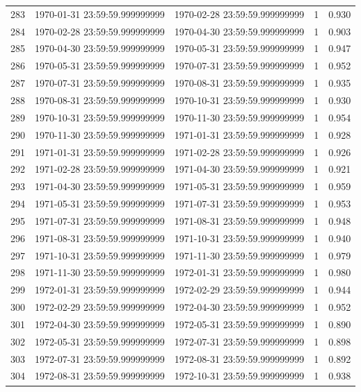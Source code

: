 \begin{table}
\begin{tabular}{lcccc}
283 & 1970-01-31 23:59:59.999999999 & 1970-02-28 23:59:59.999999999 & 1 & 0.930 \\
284 & 1970-02-28 23:59:59.999999999 & 1970-04-30 23:59:59.999999999 & 1 & 0.903 \\
285 & 1970-04-30 23:59:59.999999999 & 1970-05-31 23:59:59.999999999 & 1 & 0.947 \\
286 & 1970-05-31 23:59:59.999999999 & 1970-07-31 23:59:59.999999999 & 1 & 0.952 \\
287 & 1970-07-31 23:59:59.999999999 & 1970-08-31 23:59:59.999999999 & 1 & 0.935 \\
288 & 1970-08-31 23:59:59.999999999 & 1970-10-31 23:59:59.999999999 & 1 & 0.930 \\
289 & 1970-10-31 23:59:59.999999999 & 1970-11-30 23:59:59.999999999 & 1 & 0.954 \\
290 & 1970-11-30 23:59:59.999999999 & 1971-01-31 23:59:59.999999999 & 1 & 0.928 \\
291 & 1971-01-31 23:59:59.999999999 & 1971-02-28 23:59:59.999999999 & 1 & 0.926 \\
292 & 1971-02-28 23:59:59.999999999 & 1971-04-30 23:59:59.999999999 & 1 & 0.921 \\
293 & 1971-04-30 23:59:59.999999999 & 1971-05-31 23:59:59.999999999 & 1 & 0.959 \\
294 & 1971-05-31 23:59:59.999999999 & 1971-07-31 23:59:59.999999999 & 1 & 0.953 \\
295 & 1971-07-31 23:59:59.999999999 & 1971-08-31 23:59:59.999999999 & 1 & 0.948 \\
296 & 1971-08-31 23:59:59.999999999 & 1971-10-31 23:59:59.999999999 & 1 & 0.940 \\
297 & 1971-10-31 23:59:59.999999999 & 1971-11-30 23:59:59.999999999 & 1 & 0.979 \\
298 & 1971-11-30 23:59:59.999999999 & 1972-01-31 23:59:59.999999999 & 1 & 0.980 \\
299 & 1972-01-31 23:59:59.999999999 & 1972-02-29 23:59:59.999999999 & 1 & 0.944 \\
300 & 1972-02-29 23:59:59.999999999 & 1972-04-30 23:59:59.999999999 & 1 & 0.952 \\
301 & 1972-04-30 23:59:59.999999999 & 1972-05-31 23:59:59.999999999 & 1 & 0.890 \\
302 & 1972-05-31 23:59:59.999999999 & 1972-07-31 23:59:59.999999999 & 1 & 0.898 \\
303 & 1972-07-31 23:59:59.999999999 & 1972-08-31 23:59:59.999999999 & 1 & 0.892 \\
304 & 1972-08-31 23:59:59.999999999 & 1972-10-31 23:59:59.999999999 & 1 & 0.938 \\

\end{tabular}
\end{table}
